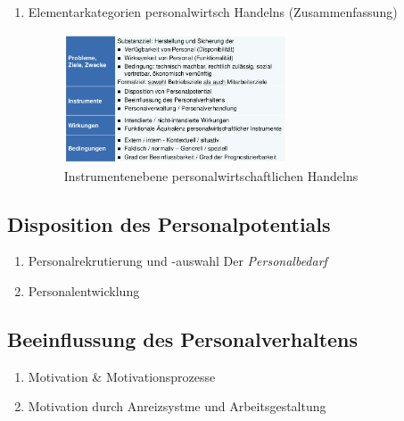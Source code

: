 \documentclass[11pt]{article}
\begin{document}
\begin{enumerate}
\item Elementarkategorien personalwirtsch Handelns (Zusammenfassung)
\label{sec:org182f75c}
\begin{figure}[htbp]
\centering
\includegraphics[width=250px]{./pictures/perskateg.png}
\caption{Instrumentenebene personalwirtschaftlichen Handelns}
\end{figure}
\end{enumerate}

\subsection{Disposition des Personalpotentials}
\label{sec:orgab2b521}
\begin{enumerate}
\item Personalrekrutierung und -auswahl
\label{sec:org0df98bb}
Der \emph{Personalbedarf}
\item Personalentwicklung
\label{sec:org13220f9}
\end{enumerate}
\subsection{Beeinflussung des Personalverhaltens}
\label{sec:org41c1f83}
\begin{enumerate}
\item Motivation \& Motivationsprozesse
\label{sec:orgb88151d}
\item Motivation durch Anreizsystme und Arbeitsgestaltung
\label{sec:org62ff121}
\end{enumerate}
\end{document}

